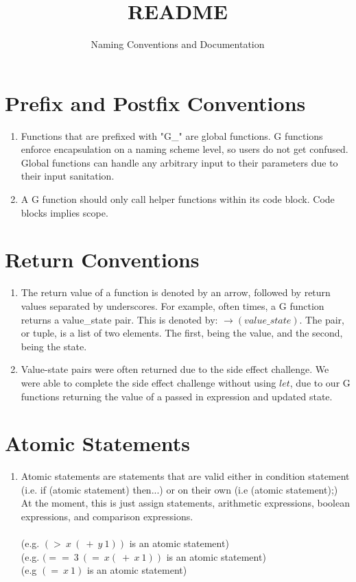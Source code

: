 \documentclass{article}
\title{README}
\author{Naming Conventions and Documentation }
\date{}
\begin{document}
\maketitle

\section{Prefix and Postfix Conventions}
\begin{enumerate}
    \item Functions that are prefixed with "G\_" are global functions. G functions enforce encapsulation on a naming scheme level, so users do not get confused. Global functions can handle any arbitrary input to their parameters due to their input sanitation. \\
    
   \item  A G function should only call helper functions within its code block. Code blocks implies scope.
\end{enumerate}


\section{Return Conventions}
\begin{enumerate}
\item The return value of a function is denoted by an arrow, followed by return values separated by underscores. For example, often times, a G function returns a value\_state pair. This is denoted by: $\rightarrow (value\_state)$. The pair, or tuple, is a list of two elements. The first, being the value, and the second, being the state. \\

\item Value-state pairs were often returned due to the side effect challenge. We were able to complete the side effect challenge without using $let$, due to our G functions returning the value of a passed in expression and updated state. \\
\end{enumerate}

\section{Atomic Statements}
\begin{enumerate}
    \item Atomic statements are statements that are valid either in condition statement (i.e. if (atomic statement) then...) or on their own (i.e (atomic statement);) At the moment, this is just assign statements, arithmetic expressions, boolean expressions, and comparison expressions.\\~\\
(e.g. $(>\ x\ (\ +\ y\ 1))$ is an atomic statement) \\
(e.g. $(==\ 3\ (=\ x (\ +\ x\ 1))$ is an atomic statement)\\
(e.g $(=\ x\ 1)$ is an atomic statement)
\end{enumerate}
\end{document}
